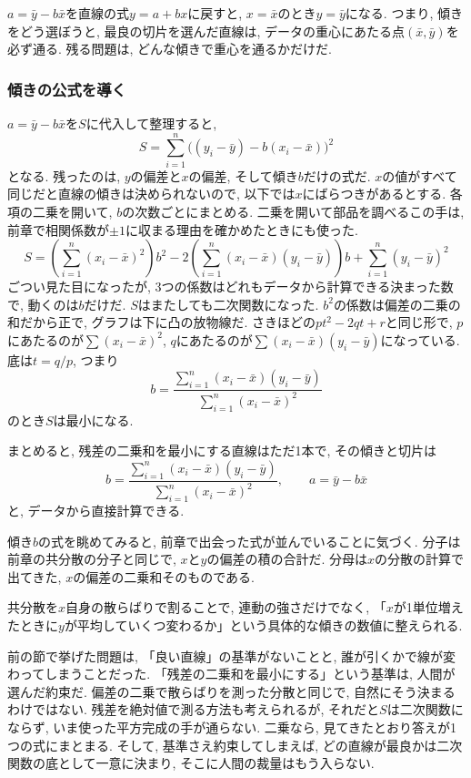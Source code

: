 $a = \bar{y} - b\bar{x}$を直線の式$y = a + bx$に戻すと, $x = \bar{x}$のとき$y = \bar{y}$になる.
つまり, 傾きをどう選ぼうと, 最良の切片を選んだ直線は, データの重心にあたる点$(\bar{x}, \bar{y})$を必ず通る.
残る問題は, どんな傾きで重心を通るかだけだ.

\subsubsection*{傾きの公式を導く}

$a = \bar{y} - b\bar{x}$を$S$に代入して整理すると,
\[
  S = \sum_{i=1}^{n} \bigl( (y_i - \bar{y}) - b(x_i - \bar{x}) \bigr)^2
\]
となる.
残ったのは, $y$の偏差と$x$の偏差, そして傾き$b$だけの式だ. $x$の値がすべて同じだと直線の傾きは決められないので, 以下では$x$にばらつきがあるとする.
各項の二乗を開いて, $b$の次数ごとにまとめる.
二乗を開いて部品を調べるこの手は, 前章で相関係数が$\pm 1$に収まる理由を確かめたときにも使った.
\[
  S = \left( \sum_{i=1}^{n}(x_i - \bar{x})^2 \right) b^2
      - 2\left( \sum_{i=1}^{n}(x_i - \bar{x})(y_i - \bar{y}) \right) b
      + \sum_{i=1}^{n}(y_i - \bar{y})^2
\]
ごつい見た目になったが, 3つの係数はどれもデータから計算できる決まった数で, 動くのは$b$だけだ.
$S$はまたしても二次関数になった.
$b^2$の係数は偏差の二乗の和だから正で, グラフは下に凸の放物線だ.
さきほどの$pt^2 - 2qt + r$と同じ形で, $p$にあたるのが$\sum(x_i - \bar{x})^2$, $q$にあたるのが$\sum(x_i - \bar{x})(y_i - \bar{y})$になっている.
底は$t = q/p$, つまり
\[
  b = \frac{\displaystyle\sum_{i=1}^{n}(x_i - \bar{x})(y_i - \bar{y})}{\displaystyle\sum_{i=1}^{n}(x_i - \bar{x})^2}
\]
のとき$S$は最小になる.

まとめると, 残差の二乗和を最小にする直線はただ1本で, その傾きと切片は
\[
  b = \frac{\displaystyle\sum_{i=1}^{n}(x_i - \bar{x})(y_i - \bar{y})}{\displaystyle\sum_{i=1}^{n}(x_i - \bar{x})^2}, \qquad a = \bar{y} - b\bar{x}
\]
と, データから直接計算できる.

傾き$b$の式を眺めてみると, 前章で出会った式が並んでいることに気づく.
分子は前章の共分散の分子と同じで, $x$と$y$の偏差の積の合計だ.
分母は$x$の分散の計算で出てきた, $x$の偏差の二乗和そのものである.

共分散を$x$自身の散らばりで割ることで, 連動の強さだけでなく, 「$x$が1単位増えたときに$y$が平均していくつ変わるか」という具体的な傾きの数値に整えられる.

前の節で挙げた問題は, 「良い直線」の基準がないことと, 誰が引くかで線が変わってしまうことだった.
「残差の二乗和を最小にする」という基準は, 人間が選んだ約束だ.
偏差の二乗で散らばりを測った分散と同じで, 自然にそう決まるわけではない.
残差を絶対値で測る方法も考えられるが, それだと$S$は二次関数にならず, いま使った平方完成の手が通らない.
二乗なら, 見てきたとおり答えが1つの式にまとまる.
そして, 基準さえ約束してしまえば, どの直線が最良かは二次関数の底として一意に決まり, そこに人間の裁量はもう入らない.

